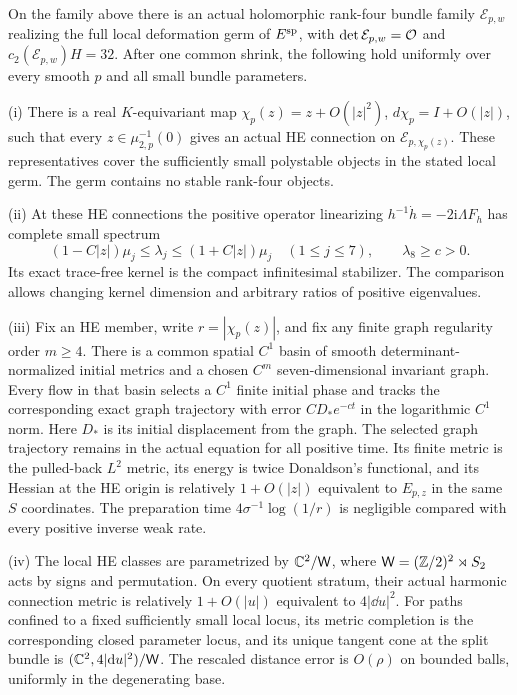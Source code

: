 \begin{theorem}\label{thm:main}
On the family above there is an actual holomorphic
rank-four bundle family $\mathcal E_{p,w}$ realizing
the full local deformation germ of $E^{\rm sp}$, with
$\det\mathcal E_{p,w}=\mathcal O$ and $c_2(\mathcal E_{p,w})H=32$.
After one common shrink, the following hold uniformly
over every smooth $p$ and all small bundle parameters.

\smallskip\noindent
\textup{(i)} There is a real $K$-equivariant map
$\chi_p(z)=z+O(|z|^2)$, $d\chi_p=I+O(|z|)$, such that
every $z\in\mu_{2,p}^{-1}(0)$ gives an actual HE
connection on $\mathcal E_{p,\chi_p(z)}$.
These representatives cover the sufficiently small
polystable objects in the stated local germ. The germ
contains no stable rank-four objects.

\smallskip\noindent
\textup{(ii)} At these HE connections the positive
operator linearizing $h^{-1}\dot h=-2\mathrm i\Lambda F_h$
has complete small spectrum
\[
 (1-C|z|)\mu_j\le\lambda_j\le(1+C|z|)\mu_j
       \quad(1\le j\le7),\qquad\lambda_8\ge c>0.
\]
Its exact trace-free kernel is the compact infinitesimal
stabilizer. The comparison allows changing kernel dimension
and arbitrary ratios of positive eigenvalues.

\smallskip\noindent
\textup{(iii)} Fix an HE member, write $r=|\chi_p(z)|$,
and fix any finite graph regularity order $m\ge4$.
There is a common spatial $C^1$ basin of smooth
determinant-normalized initial metrics and a chosen
$C^m$ seven-dimensional invariant graph. Every flow
in that basin selects a $C^1$ finite initial phase
and tracks the corresponding exact graph trajectory
with error $CD_*e^{-ct}$ in the logarithmic $C^1$ norm.
Here $D_*$ is its initial displacement from the graph.
The selected graph trajectory remains in the actual
equation for all positive time. Its finite metric is
the pulled-back $L^2$ metric, its energy is twice
Donaldson's functional, and its Hessian at the HE
origin is relatively $1+O(|z|)$ equivalent to $E_{p,z}$
in the same $S$ coordinates. The preparation time
$4\sigma^{-1}\log(1/r)$ is negligible compared with
every positive inverse weak rate.

\smallskip\noindent
\textup{(iv)} The local HE classes are parametrized by
$\mathbb C^2/\mathsf W$, where $\mathsf W=(\mathbb Z/2)^2\rtimes S_2$
acts by signs and permutation. On every quotient stratum,
their actual harmonic connection metric is relatively
$1+O(|u|)$ equivalent to $4|\dd u|^2$.
For paths confined to a fixed sufficiently small local
locus, its metric completion is the corresponding
closed parameter locus, and its unique tangent cone at
the split bundle is $(\mathbb C^2,4|\mathrm d u|^2)/\mathsf W$.
The rescaled distance error is $O(\rho)$ on bounded
balls, uniformly in the degenerating base.
\end{theorem}

